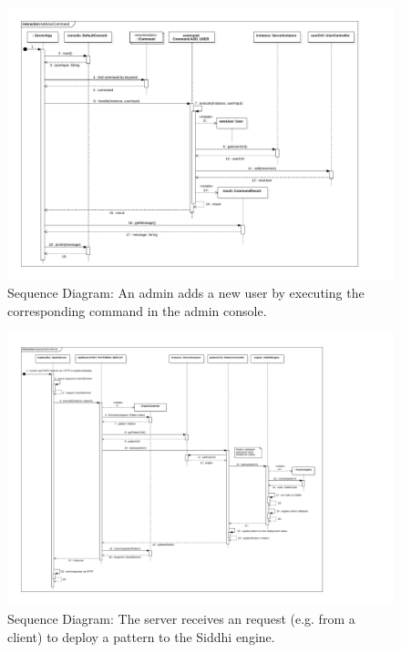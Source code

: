 \FloatBarrier
\begin{figure}[h]
    \centering
    \includegraphics[width=\textwidth]{../module_res/server-sd-addusercmd.pdf}
    \caption{Sequence Diagram:
        An admin adds a new user by executing the corresponding command in the
        admin console.
    \label{fig:server-sd-addusercmd}}
\end{figure}

\begin{figure}[h]
    \centering
    \includegraphics[width=\textwidth]{../module_res/server-sd-deploypatternroute.pdf}
    \caption{Sequence Diagram:
        The server receives an request (e.g. from a client) to deploy a pattern
        to the Siddhi engine.
    \label{fig:server-sd-deploypatternroute}}
\end{figure}

